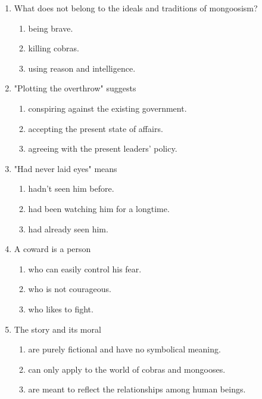\documentclass[11pt,a4paper]{article}
\begin{document}
\begin{enumerate}
    \item What does not belong to the ideals and traditions of mongoosism?
    \begin{enumerate}[label=\alph*.]
        \item being brave.
        \item killing cobras.
        \item using reason and intelligence.
    \end{enumerate}

    \item "Plotting the overthrow" suggests
    \begin{enumerate}[label=\alph*.]
        \item conspiring against the existing government.
        \item accepting the present state of affairs.
        \item agreeing with the present leaders' policy.
    \end{enumerate}

    \item "Had never laid eyes" means
    \begin{enumerate}[label=\alph*.]
        \item hadn't seen him before.
        \item had been watching him for a longtime.
        \item had already seen him.
    \end{enumerate}

    \item A coward is a person
    \begin{enumerate}[label=\alph*.]
        \item who can easily control his fear.
        \item who is not courageous.
        \item who likes to fight.
    \end{enumerate}

    \item The story and its moral
    \begin{enumerate}[label=\alph*.]
        \item are purely fictional and have no symbolical meaning.
        \item can only apply to the world of cobras and mongooses.
        \item are meant to reflect the relationships among human beings.
    \end{enumerate}


\end{enumerate}
\end{document}
